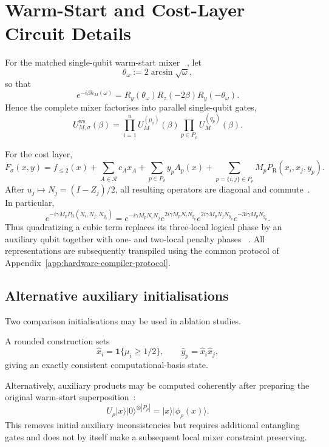 \documentclass[a4paper,onecolumn,11pt,unpublished]{quantumarticle}
\theoremstyle{remark}
\begin{document}
\section{Warm-Start and Cost-Layer Circuit Details}
\label{app:warm-start-circuits}

For the matched single-qubit warm-start mixer
~\cite{Egger2021,TateCustom2023}, let
\[
\theta_\omega:=2\arcsin\sqrt{\omega},
\]
so that
\[
e^{-i\beta h_M(\omega)}
=
R_y(\theta_\omega)
R_z(-2\beta)
R_y(-\theta_\omega).
\]
Hence the complete mixer factorises into parallel single-qubit gates,
\[
U_{M,\sigma}^{\mathrm{ws}}(\beta)
=
\prod_{i=1}^n U_M^{(\mu_i)}(\beta)
\prod_{p\in P_\rho}U_M^{(q_p)}(\beta).
\]

For the cost layer,
\[
F_\sigma(x,y)
=
f_{\le2}(x)
+\sum_{A\in\mathcal R}c_Ax_A
+\sum_{p\in P_\rho}y_pA_p(x)
+\sum_{p=\{i,j\}\in P_\rho}
M_pP_{\mathrm R}(x_i,x_j,y_p).
\]
After $u_j\mapsto N_j=(I-Z_j)/2$, all resulting operators are diagonal and
commute~\cite{Hadfield2021,CampbellDahl2022}.  In particular,
\[
e^{-i\gamma M_p P_{\mathrm R}(N_i,N_j,N_{y_p})}
=
e^{-i\gamma M_pN_iN_j}
e^{2i\gamma M_pN_iN_{y_p}}
e^{2i\gamma M_pN_jN_{y_p}}
e^{-3i\gamma M_pN_{y_p}}.
\]
Thus quadratizing a cubic term replaces its three-local logical phase by an
auxiliary qubit together with one- and two-local penalty phases
~\cite{Schmidbauer2024,Schmidbauer2026}.  All
representations are subsequently transpiled using the common protocol of
Appendix~\ref{app:hardware-compiler-protocol}.



\subsection{Alternative auxiliary initialisations}
\label{app:alternative-warm-starts}

Two comparison initialisations may be used in ablation studies.

A rounded construction sets
\[
\hat x_i=\mathbf 1\{\mu_i\ge 1/2\},
\qquad
\hat y_p=\hat x_i\hat x_j,
\]
giving an exactly consistent computational-basis state.

Alternatively, auxiliary products may be computed coherently after preparing
the original warm-start superposition~\cite{Egger2021}:
\[
U_\rho
|x\rangle|0\rangle^{\otimes |P_\rho|}
=
|x\rangle|\phi_\rho(x)\rangle .
\]
This removes initial auxiliary inconsistencies but requires additional
entangling gates and does not by itself make a subsequent local mixer
constraint preserving.
\end{document}

